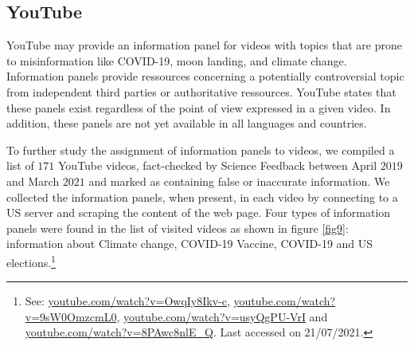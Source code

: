 \documentclass{article}
\begin{document}
\subsection{YouTube}

YouTube may provide an information panel for videos with topics that are prone to misinformation like COVID-19, moon landing, and climate change. Information panels provide ressources concerning a potentially controversial topic from independent third parties or authoritative ressources. YouTube states that these panels exist regardless of the point of view expressed in a given video. In addition, these panels are not yet available in all languages and countries. %

\smallskip

To further study the assignment of information panels to videos, we compiled a list of $171$ YouTube videos, fact-checked by Science Feedback between April $2019$ and March $2021$ and marked as containing false or inaccurate information. We collected the information panels, when present, in each video by connecting to a US server and scraping the content of the web page. Four types of information panels were found in the list of visited videos as shown in figure \ref{fig9}:  information about Climate change, COVID-19 Vaccine, COVID-19 and US elections.\footnote{See: \href{https://www.youtube.com/watch?v=OwqIy8Ikv-c}{youtube.com/watch?v=OwqIy8Ikv-c}, \href{https://www.youtube.com/watch?v=9sW0OmzcmL0}{youtube.com/watch?v=9sW0OmzcmL0}, \href{https://www.youtube.com/watch?v=usyQgPU-VrI}{youtube.com/watch?v=usyQgPU-VrI} and \href{https://www.youtube.com/watch?v=8PAwc8nlE\_Q}{youtube.com/watch?v=8PAwc8nlE\_Q}. Last accessed on  21/07/2021.  }
\end{document}
